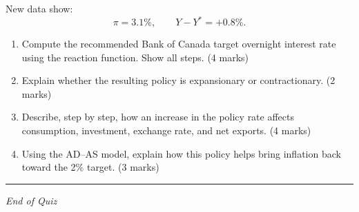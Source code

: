 \documentclass[12pt]{article}
\begin{document}
New data show:
\[
\pi = 3.1\%, \qquad Y - Y^* = +0.8\%.
\]



\begin{enumerate}
    \item[(a)] Compute the recommended Bank of Canada target overnight interest rate using the reaction function. Show all steps. (4 marks)
    \item[(b)] Explain whether the resulting policy is expansionary or contractionary. (2 marks)
    \item[(c)] Describe, step by step, how an increase in the policy rate affects consumption, investment, exchange rate, and net exports. (4 marks)
    \item[(d)] Using the AD--AS model, explain how this policy helps bring inflation back toward the 2\% target. (3 marks)
\end{enumerate}

\hrule
\vspace{1em}

\begin{center}
\textit{End of Quiz}
\end{center}
\end{document}
